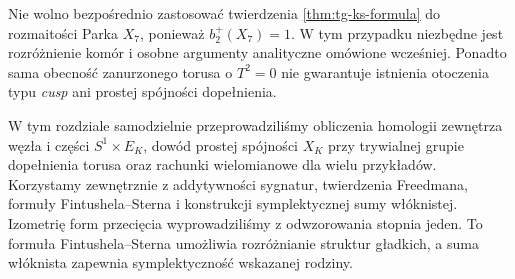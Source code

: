 Nie wolno bezpośrednio zastosować twierdzenia
\ref{thm:tg-ks-formula} do rozmaitości Parka $X_7$,
ponieważ $b_2^+(X_7)=1$. W tym przypadku
niezbędne jest rozróżnienie komór i osobne
argumenty analityczne omówione wcześniej.
Ponadto sama obecność zanurzonego torusa o
$T^2=0$ nie gwarantuje istnienia otoczenia typu
\emph{cusp} ani prostej spójności dopełnienia.

\begin{uwaga}
W tym rozdziale samodzielnie przeprowadziliśmy
obliczenia homologii zewnętrza węzła i części
$S^1\times E_K$, dowód prostej spójności
$X_K$ przy trywialnej grupie dopełnienia torusa
oraz rachunki wielomianowe dla wielu przykładów.
Korzystamy zewnętrznie z addytywności sygnatur,
twierdzenia Freedmana, formuły Fintushela--Sterna
i konstrukcji symplektycznej sumy włóknistej.
Izometrię form przecięcia wyprowadziliśmy
z odwzorowania stopnia jeden. To formuła
Fintushela--Sterna umożliwia rozróżnianie
struktur gładkich, a suma włóknista zapewnia
symplektyczność wskazanej rodziny.
\end{uwaga}


